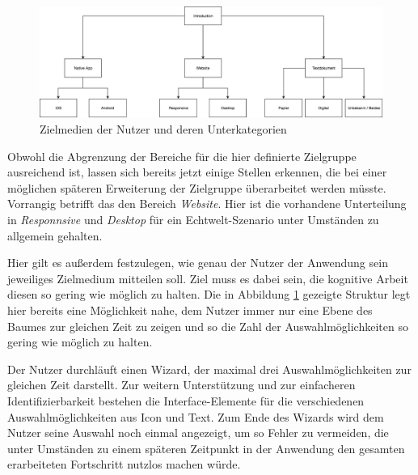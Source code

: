 \begin{figure}[h]
    \centering
    \includegraphics[width=1\textwidth]{images/ablauf_intro.png}
    \caption{Zielmedien der Nutzer und deren Unterkategorien}
    \label{fig:intro}
\end{figure}

Obwohl die Abgrenzung der Bereiche für die hier definierte Zielgruppe ausreichend ist, lassen sich bereits jetzt einige Stellen erkennen, die bei einer möglichen späteren Erweiterung der Zielgruppe überarbeitet werden müsste. Vorrangig betrifft das den Bereich \textit{Website}. Hier ist die vorhandene Unterteilung in \textit{Responnsive} und \textit{Desktop} für ein Echtwelt-Szenario unter Umständen zu allgemein gehalten.

Hier gilt es außerdem festzulegen, wie genau der Nutzer der Anwendung sein jeweiliges Zielmedium mitteilen soll. Ziel muss es dabei sein, die kognitive Arbeit\footnotemark{} diesen so gering wie möglich zu halten. Die in Abbildung \ref{fig:intro} gezeigte Struktur legt hier bereits eine Möglichkeit nahe, dem Nutzer immer nur eine Ebene des Baumes zur gleichen Zeit zu zeigen und so die Zahl der Auswahlmöglichkeiten so gering wie möglich zu halten.\\


Der Nutzer durchläuft einen Wizard\footnotemark{}, der maximal drei Auswahlmöglichkeiten zur gleichen Zeit darstellt. Zur weitern Unterstützung und zur einfacheren Identifizierbarkeit bestehen die Interface-Elemente für die verschiedenen Auswahlmöglichkeiten aus Icon und Text.
Zum Ende des Wizards wird dem Nutzer seine Auswahl noch einmal angezeigt, um so Fehler zu vermeiden, die unter Umständen zu einem späteren Zeitpunkt in der Anwendung den gesamten erarbeiteten Fortschritt nutzlos machen würde.



